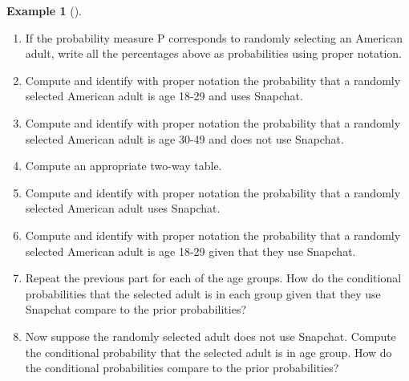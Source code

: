 \documentclass[
  letterpaper,
  DIV=11,
  numbers=noendperiod]{scrreprt}
\providecommand{\tightlist}{%
  \setlength{\itemsep}{0pt}\setlength{\parskip}{0pt}}
\theoremstyle{plain}
\theoremstyle{definition}
\newtheorem{example}{Example}[chapter]
\theoremstyle{definition}
\theoremstyle{definition}
\theoremstyle{remark}
\begin{document}
\begin{tcolorbox}[enhanced jigsaw, opacityback=0, left=2mm, colframe=quarto-callout-note-color-frame, toprule=.15mm, breakable, colback=white, leftrule=.75mm, arc=.35mm, rightrule=.15mm, bottomrule=.15mm]
\begin{example}[]
\begin{enumerate}
\def\labelenumi{\arabic{enumi}.}
\tightlist
\item
  If the probability measure \(\textrm{P}\) corresponds to randomly
  selecting an American adult, write all the percentages above as
  probabilities using proper notation.
\item
  Compute and identify with proper notation the probability that a
  randomly selected American adult is age 18-29 and uses Snapchat.
\item
  Compute and identify with proper notation the probability that a
  randomly selected American adult is age 30-49 and does not use
  Snapchat.
\item
  Compute an appropriate two-way table.
\item
  Compute and identify with proper notation the probability that a
  randomly selected American adult uses Snapchat.
\item
  Compute and identify with proper notation the probability that a
  randomly selected American adult is age 18-29 given that they use
  Snapchat.
\item
  Repeat the previous part for each of the age groups. How do the
  conditional probabilities that the selected adult is in each group
  given that they use Snapchat compare to the prior probabilities?
\item
  Now suppose the randomly selected adult does not use Snapchat. Compute
  the conditional probability that the selected adult is in age group.
  How do the conditional probabilities compare to the prior
  probabilities?
\end{enumerate}

\end{example}

\end{tcolorbox}
\end{document}
